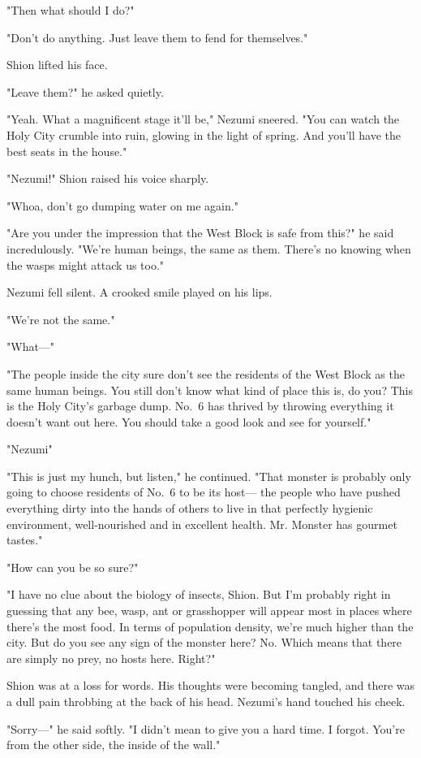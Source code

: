 "Then what should I do?"

"Don't do anything. Just leave them to fend for themselves."

Shion lifted his face.

"Leave them?" he asked quietly.

"Yeah. What a magnificent stage it'll be," Nezumi sneered. "You can
watch the Holy City crumble into ruin, glowing in the light of spring.
And you'll have the best seats in the house."

"Nezumi!" Shion raised his voice sharply.

"Whoa, don't go dumping water on me again."

"Are you under the impression that the West Block is safe from this?" he
said incredulously. "We're human beings, the same as them. There's no
knowing when the wasps might attack us too."

Nezumi fell silent. A crooked smile played on his lips.

"We're not the same."

"What---"

"The people inside the city sure don't see the residents of the West
Block as the same human beings. You still don't know what kind of place
this is, do you? This is the Holy City's garbage dump. No.~6 has thrived
by throwing everything it doesn't want out here. You should take a good
look and see for yourself."

"Nezumi\el "

"This is just my hunch, but listen," he continued. "That monster is
probably only going to choose residents of No.~6 to be its host--- the
people who have pushed everything dirty into the hands of others to live
in that perfectly hygienic environment, well-nourished and in excellent
health. Mr. Monster has gourmet tastes."

"How can you be so sure?"

"I have no clue about the biology of insects, Shion. But I'm probably
right in guessing that any bee, wasp, ant or grasshopper will appear
most in places where there's the most food. In terms of population
density, we're much higher than the city. But do you see any sign of the
monster here? No. Which means that there are simply no prey, no hosts
here. Right?"

Shion was at a loss for words. His thoughts were becoming tangled, and
there was a dull pain throbbing at the back of his head. Nezumi's hand
touched his cheek.

"Sorry---" he said softly. "I didn't mean to give you a hard time. I
forgot. You're from the other side, the inside of the wall."

